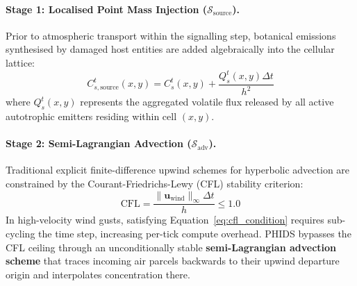 \paragraph{Stage 1: Localised Point Mass Injection ($\mathcal{S}_{\text{source}}$).}
Prior to atmospheric transport within the signalling step, botanical emissions synthesised by damaged host entities are added algebraically into the cellular lattice:
\begin{equation}
  C_{s,\text{source}}^t(x, y) = C_s^t(x, y) + \frac{Q_s^t(x, y) \Delta t}{h^2}
  \label{eq:mass_injection_step}
\end{equation}
where $Q_s^t(x, y)$ represents the aggregated volatile flux released by all active autotrophic emitters residing within cell $(x, y)$.

\paragraph{Stage 2: Semi-Lagrangian Advection ($\mathcal{S}_{\text{adv}}$).}
Traditional explicit finite-difference upwind schemes for hyperbolic advection are constrained by the Courant-Friedrichs-Lewy (CFL) stability criterion:
\begin{equation}
  \text{CFL} = \frac{\|\mathbf{u}_{\text{wind}}\|_{\infty} \Delta t}{h} \le 1.0
  \label{eq:cfl_condition}
\end{equation}
In high-velocity wind gusts, satisfying Equation~\eqref{eq:cfl_condition} requires sub-cycling the time step, increasing per-tick compute overhead. PHIDS bypasses the CFL ceiling through an unconditionally stable \textbf{semi-Lagrangian advection scheme} that traces incoming air parcels backwards to their upwind departure origin and interpolates concentration there.

